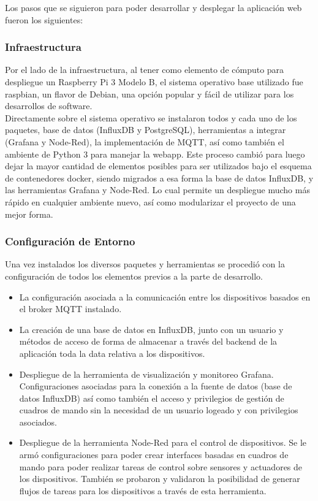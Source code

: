 Los pasos que se siguieron para poder desarrollar y desplegar la aplicación web fueron los siguientes:

\subsubsection{Infraestructura}
Por el lado de la infraestructura, al tener como elemento de cómputo para despliegue un Raspberry Pi 3 Modelo B, el sistema operativo base utilizado fue raspbian, un flavor de Debian, una opción popular y fácil de utilizar para los desarrollos de software.\\

Directamente sobre el sistema operativo se instalaron todos y cada uno de los paquetes, base de datos (InfluxDB y PostgreSQL), herramientas a integrar (Grafana y Node-Red), la implementación de MQTT, así como también el ambiente de Python 3 para manejar la webapp.  Este proceso cambió para luego dejar la mayor cantidad de elementos posibles para ser utilizados bajo el esquema de contenedores docker, siendo migrados a esa forma la base de datos InfluxDB, y las herramientas Grafana y Node-Red. Lo cual permite un despliegue mucho más rápido en cualquier ambiente nuevo, así como modularizar el proyecto de una mejor forma.

\subsubsection{Configuración de Entorno}
Una vez instalados los diversos paquetes y herramientas se procedió con la configuración de todos los elementos previos a la parte de desarrollo.
\begin{itemize}
\item La configuración asociada a la comunicación entre los dispositivos basados en el broker MQTT instalado. 
\item La creación de una base de datos en InfluxDB, junto con un usuario y métodos de acceso de forma de almacenar a través del backend de la aplicación toda la data relativa a los dispositivos. 
\item Despliegue de la herramienta de visualización y monitoreo Grafana. Configuraciones asociadas para la conexión a la fuente de datos (base de datos InfluxDB) así como también el acceso y privilegios de gestión de cuadros de mando sin la necesidad de un usuario logeado y con privilegios asociados.
\item Despliegue de la herramienta Node-Red para el control de dispositivos. Se le armó configuraciones para poder crear interfaces basadas en cuadros de mando para poder realizar tareas de control sobre sensores y actuadores de los dispositivos. También se probaron y validaron la posibilidad de generar flujos de tareas para los dispositivos a través de esta herramienta.
\end{itemize}

